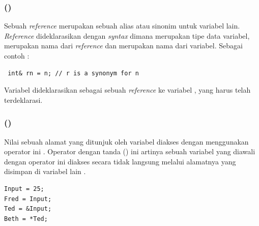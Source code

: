 \documentclass[../main.tex]{subfiles}
\begin{document}
\subsubsection{{\Reference} (\citecode{\&})}
\begin{indentpar}\hpar{}
    Sebuah \textit{reference} merupakan sebuah alias atau sinonim untuk variabel lain. \textit{Reference} dideklarasikan dengan \textit{syntax}  dimana  merupakan tipe data variabel,  merupakan nama dari \textit{reference} dan  merupakan nama dari variabel. Sebagai contoh \parencite{hubbard2021programming} :
\end{indentpar}
\vspace{-2ex}
\begin{code}[n]
\begin{verbatim}
 int& rn = n; // r is a synonym for n
\end{verbatim}
\end{code}
\vspace{-0.5ex}
\begin{indentpar}
    Variabel  dideklarasikan sebagai sebuah \textit{reference} ke variabel , yang harus telah terdeklarasi.
\end{indentpar}

\subsubsection{{\Dereference} (\citecode{*})}

\begin{indentpar}\hpar{}
    Nilai sebuah alamat yang ditunjuk oleh variabel {\pointer} diakses dengan menggunakan operator ini \parencite{achmad2018modul}. Operator {\indirect} dengan tanda {\asterisk} (\citecode{*}) ini artinya sebuah variabel yang diawali dengan operator ini diakses secara tidak langsung melalui alamatnya yang disimpan di variabel lain \parencite{munir2007algoritma}.
\end{indentpar}
\vspace{-1ex}
\begin{code}[n]
\begin{verbatim}
Input = 25;
Fred = Input;
Ted = &Input;
Beth = *Ted;
\end{verbatim}
\end{code}
\end{document}
